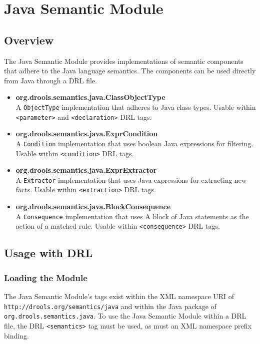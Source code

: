 \chapter{Java Semantic Module}

\section{Overview}

The Java Semantic Module provides implementations of semantic
components that adhere to the Java language semantics.  The components
can be used directly from Java through a DRL file.


\begin{itemize}
	\item \textbf{\textsf{org.drools.semantics.java.ClassObjectType}}\\
		A \verb|ObjectType| implementation that adheres
		to Java class types.  Usable within \verb|<parameter>|
		and \verb|<declaration>| DRL tags.
	\item \textbf{\textsf{org.drools.semantics.java.ExprCondition}}\\
		A \verb|Condition| implementation that uses boolean
		Java expressions for filtering. Usable within 
		\verb|<condition>| DRL tags.
	\item \textbf{\textsf{org.drools.semantics.java.ExprExtractor}}\\
		A \verb|Extractor| implementation that uses Java
		expressions for extracting new facts.  Usable
		within \verb|<extraction>| DRL tags.
	\item \textbf{\textsf{org.drools.semantics.java.BlockConsequence}}\\
		A \verb|Consequence| implementation that uses
		A block of Java statements as the action of a
		matched rule.  Usable within \verb|<consequence>|
		DRL tags.
\end{itemize}

\clearpage

\section{Usage with DRL}

\subsection{Loading the Module}

The Java Semantic Module's tags exist within the XML namespace
URI of \verb|http://drools.org/semantics/java| and within the
Java package of\\ \verb|org.drools.semantics.java|.  To use the
Java Semantic Module within a DRL file, the DRL \verb|<semantics>|
tag must be used, as must an XML namespace prefix binding.

